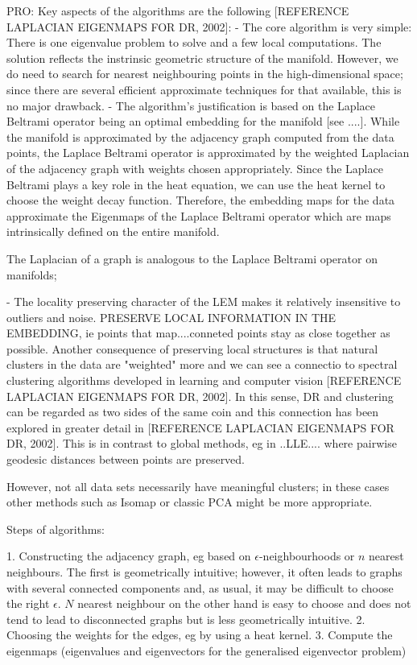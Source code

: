 \documentclass[journal, a4paper]{IEEEtran}
\begin{document}
PRO:
Key aspects of the algorithms are the following [REFERENCE LAPLACIAN EIGENMAPS FOR DR, 2002]:
- The core algorithm is very simple: There is one eigenvalue problem to solve and a few local computations. The solution reflects the instrinsic geometric structure of the manifold. However, we do need to search for nearest neighbouring points in the high-dimensional space; since there are several efficient approximate techniques for that available, this is no major drawback.
- The algorithm's justification is based on the Laplace Beltrami operator being an optimal embedding for the manifold [see ....]. 
While the manifold is approximated by the adjacency graph computed from the data points, the Laplace Beltrami operator is approximated by the weighted Laplacian of the adjacency graph with weights chosen appropriately. %
Since the Laplace Beltrami plays a key role in the heat equation, we can use the heat kernel to choose the weight decay function. Therefore, the embedding maps for the data approximate the Eigenmaps of the Laplace Beltrami operator which are maps intrinsically defined on the entire manifold.

The Laplacian of a graph is analogous to the Laplace Beltrami operator on manifolds; 

- The locality preserving character of the LEM makes it relatively insensitive to outliers and noise. 
PRESERVE LOCAL INFORMATION IN THE EMBEDDING, ie points that map....conneted points stay as close together as possible.
Another consequence of preserving local structures  is that natural clusters in the data are "weighted" more and we can see a connectio to spectral clustering algorithms developed in learning and computer vision [REFERENCE LAPLACIAN EIGENMAPS FOR DR, 2002].
In this sense, DR and clustering can be regarded as two sides of the same coin and this connection has been explored in greater detail in [REFERENCE LAPLACIAN EIGENMAPS FOR DR, 2002]. 
This is in contrast to global methods, eg in ..LLE.... where pairwise geodesic distances between points are preserved.

However, not all data sets necessarily have meaningful clusters; in these cases other methods such as Isomap or classic PCA might be more appropriate. 

Steps of algorithms:

1. Constructing the adjacency graph, eg based on \( \epsilon \)-neighbourhoods or \( n \) nearest neighbours.
The first is geometrically intuitive; however, it often leads to graphs with several connected components and, as usual, it may be difficult to choose the right \( \epsilon \). \( N \) nearest neighbour on the other hand is easy to choose and does not tend to lead to disconnected graphs but is less geometrically intuitive.
2. Choosing the weights for the edges, eg by using a heat kernel.
3. Compute the eigenmaps (eigenvalues and eigenvectors for the generalised eigenvector problem)
\end{document}
